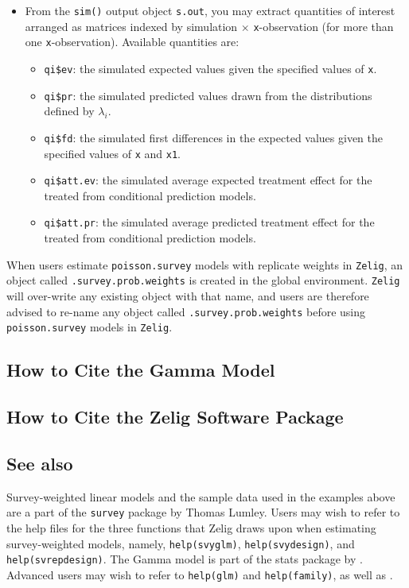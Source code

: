 \begin{itemize}
\item From the {\tt sim()} output object {\tt s.out}, you may extract
  quantities of interest arranged as matrices indexed by simulation
  $\times$ {\tt x}-observation (for more than one {\tt x}-observation).
  Available quantities are:

   \begin{itemize}
   \item {\tt qi\$ev}: the simulated expected values given the
     specified values of {\tt x}.
   \item {\tt qi\$pr}: the simulated predicted values drawn from the
     distributions defined by $\lambda_i$.
   \item {\tt qi\$fd}: the simulated first differences in the expected
     values given the specified values of {\tt x} and {\tt x1}.
   \item {\tt qi\$att.ev}: the simulated average expected treatment
     effect for the treated from conditional prediction models.  
   \item {\tt qi\$att.pr}: the simulated average predicted treatment
     effect for the treated from conditional prediction models.  
   \end{itemize}
\end{itemize}

When users estimate {\tt poisson.survey} models with replicate weights in {\tt Zelig}, an 
object called {\tt .survey.prob.weights} is created in the global environment.  
{\tt Zelig} will over-write any existing object with that name, and users 
are therefore advised to re-name any object called {\tt .survey.prob.weights} before using {\tt poisson.survey} models in {\tt Zelig}.


\subsection*{How to Cite the Gamma Model}

\subsection*{How to Cite the Zelig Software Package}
\CiteZelig

 
\subsection* {See also}
 
 Survey-weighted linear models and the sample data used in the
 examples above are a part of the {\tt survey} package by Thomas
 Lumley. Users may wish to refer to the help files for the three
 functions that Zelig draws upon when estimating survey-weighted
 models, namely, {\tt help(svyglm)}, {\tt help(svydesign)}, and {\tt
 help(svrepdesign)}.  The Gamma model is part of the stats package
 by \citet{VenRip02}. Advanced users may wish to refer to
 \texttt{help(glm)} and \texttt{help(family)}, as well as
 \cite{McCNel89}.
  




